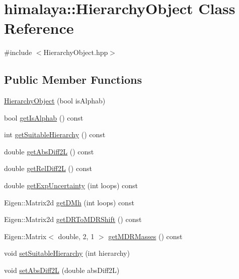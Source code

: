 \hypertarget{classhimalaya_1_1HierarchyObject}{}\section{himalaya\+:\+:Hierarchy\+Object Class Reference}
\label{classhimalaya_1_1HierarchyObject}


{\ttfamily \#include $<$Hierarchy\+Object.\+hpp$>$}

\subsection*{Public Member Functions}
\begin{DoxyCompactItemize}
\item 
\hyperlink{classhimalaya_1_1HierarchyObject_aba8877b52224daf85c7fbe52620162e5}{Hierarchy\+Object} (bool is\+Alphab)
\item 
bool \hyperlink{classhimalaya_1_1HierarchyObject_a1666f351914e563ac910afc552a6932a}{get\+Is\+Alphab} () const 
\item 
int \hyperlink{classhimalaya_1_1HierarchyObject_aa22fec3eb13eb3302fd7034d87dc91db}{get\+Suitable\+Hierarchy} () const 
\item 
double \hyperlink{classhimalaya_1_1HierarchyObject_a9dd4da9b49984440fe2c8cbcd0f0c5d8}{get\+Abs\+Diff2L} () const 
\item 
double \hyperlink{classhimalaya_1_1HierarchyObject_a8f37a14669ca0890edce34836d119073}{get\+Rel\+Diff2L} () const 
\item 
double \hyperlink{classhimalaya_1_1HierarchyObject_a28ec351fd97a6c0de44ae51ce7415033}{get\+Exp\+Uncertainty} (int loops) const 
\item 
Eigen\+::\+Matrix2d \hyperlink{classhimalaya_1_1HierarchyObject_a81e50f8e67ccb1055088b0d7ed591205}{get\+D\+Mh} (int loops) const 
\item 
Eigen\+::\+Matrix2d \hyperlink{classhimalaya_1_1HierarchyObject_a992a8b0156296168ca71b6701ab1b1b7}{get\+D\+R\+To\+M\+D\+R\+Shift} () const 
\item 
Eigen\+::\+Matrix$<$ double, 2, 1 $>$ \hyperlink{classhimalaya_1_1HierarchyObject_a023c789e0c2c17810bbf12d7075ce887}{get\+M\+D\+R\+Masses} () const 
\item 
void \hyperlink{classhimalaya_1_1HierarchyObject_a6f77f9c7f9173858089e83bcaa8362f2}{set\+Suitable\+Hierarchy} (int hierarchy)
\item 
void \hyperlink{classhimalaya_1_1HierarchyObject_a48341b55e1bb9270c7666a3be8f4d0fd}{set\+Abs\+Diff2L} (double abs\+Diff2L)

\end{DoxyCompactItemize}
